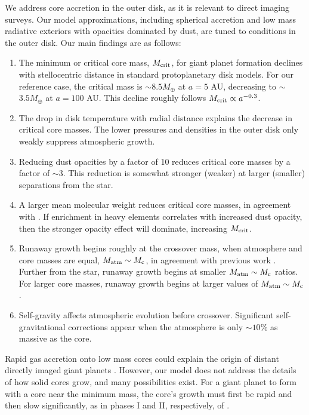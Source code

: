 \documentclass[apj, numberedappendix]{emulateapj}
\newcommand{\co}{_{\rm c}}
\newcommand{\MC}{M_{\rm crit}}
\begin{document}
We address core accretion in the outer disk, as it is relevant to direct imaging surveys.  Our model approximations, including spherical accretion and low mass radiative exteriors with opacities dominated by dust, are tuned to conditions in the outer disk.   Our main findings are as follows:

\begin{enumerate}
\item The minimum or critical core mass, $\MC$, for giant planet formation declines with stellocentric distance in standard protoplanetary disk models.  For our reference case, the critical mass is $\sim$$8.5 M_{\oplus}$ at $a = 5$ AU, decreasing to $\sim$$3.5 M_{\oplus}$ at $a =100$ AU.  This decline roughly follows $\MC \propto a^{-0.3}$.

\item The drop in disk temperature with radial distance explains the decrease in critical core masses.  The lower pressures and densities in the outer disk only weakly suppress atmospheric growth.

\item Reducing dust opacities by a factor of 10 reduces critical core masses by a factor of $\sim$$3$.  This reduction is somewhat stronger (weaker) at larger (smaller) separations from the star.

\item A larger mean molecular weight reduces critical core masses, in agreement with \citet{HorIko11}.  If enrichment in heavy elements correlates with increased dust opacity, then the stronger opacity effect will dominate, increasing $\MC$.

\item Runaway growth begins roughly at the crossover mass, when atmosphere and core masses are equal, $M_{\rm atm} \sim M\co$, in agreement with previous work \citep{pollack96}.  Further from the star, runaway growth begins at smaller $M_{\rm atm} \sim M\co$ ratios.  For larger core masses, runaway growth begins at larger values of $M_{\rm atm} \sim M\co$.

\item Self-gravity affects atmospheric evolution before crossover.  Significant self-gravitational corrections appear when the atmosphere is only $\sim$$10 \%$ as massive as the core.

\end{enumerate}

Rapid gas accretion onto low mass cores could explain the origin of distant directly imaged giant planets \citep{marois08, lagrange10}.  However, our model does not address the details of how solid cores grow, and many possibilities exist.  For a giant planet to form with a core near the minimum mass, the core's growth must  first be rapid and then slow significantly, as in phases I and II, respectively, of \cite{pollack96}.   
\end{document}
